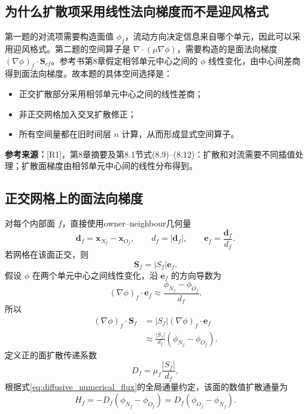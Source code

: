 \documentclass[UTF8,12pt,a4paper]{ctexart}
\numberwithin{equation}{section}
\newcommand{\Rone}{\textnormal{[R1]}}
\newcommand{\source}[1]{%
  \par\smallskip
  \noindent\colorbox{sourcebg}{%
    \parbox{0.955\linewidth}{\raggedright\footnotesize\color{sourcegray}\textbf{参考来源：}#1}%
  }
  \par\smallskip
}
\newcommand{\Sf}{\bm S}
\newcommand{\xf}{\bm x}
\newcommand{\ef}{\bm e}
\begin{document}
\subsection{为什么扩散项采用线性法向梯度而不是迎风格式}

第一题的对流项需要构造面值 $\phi_f$，流动方向决定信息来自哪个单元，因此可以采用迎风格式。第二题的空间算子是 $\nabla\cdot(\mu\nabla\phi)$，需要构造的是面法向梯度 $(\nabla\phi)_f\cdot\Sf_{cf}$。参考书第8章假定相邻单元中心之间的 $\phi$ 线性变化，由中心间差商得到面法向梯度。故本题的具体空间选择是：
\begin{itemize}
  \item 正交扩散部分采用相邻单元中心之间的线性差商；
  \item 非正交网格加入交叉扩散修正；
  \item 所有空间量都在旧时间层 $n$ 计算，从而形成显式空间算子。
\end{itemize}

\source{\Rone，第8章摘要及第8.1节式(8.9)--(8.12)：扩散和对流需要不同插值处理；扩散面梯度由相邻单元中心间的线性分布得到。}

\subsection{正交网格上的面法向梯度}

对每个内部面 $f$，直接使用owner--neighbour几何量
\begin{equation}
  \bm d_f=\xf_{N_f}-\xf_{O_f},
  \qquad
  d_f=|\bm d_f|,
  \qquad
  \ef_f=\frac{\bm d_f}{d_f}.
  \label{eq:center_vector}
\end{equation}
若网格在该面正交，则
\begin{equation}
  \Sf_f=|S_f|\ef_f.
  \label{eq:orthogonal_area_vector}
\end{equation}
假设 $\phi$ 在两个单元中心之间线性变化，沿 $\ef_f$ 的方向导数为
\begin{equation}
  (\nabla\phi)_f\cdot\ef_f
  \approx\frac{\phi_{N_f}-\phi_{O_f}}{d_f}.
  \label{eq:normal_difference}
\end{equation}
所以
\begin{align}
  (\nabla\phi)_f\cdot\Sf_f
  &=|S_f|(\nabla\phi)_f\cdot\ef_f
    \label{eq:orth_grad_1}\\
  &\approx\frac{|S_f|}{d_f}(\phi_{N_f}-\phi_{O_f}).
    \label{eq:orth_grad_2}
\end{align}
定义正的面扩散传递系数
\begin{equation}
  \boxed{D_f=\mu_f\frac{|S_f|}{d_f}},
  \label{eq:D_orth}
\end{equation}
根据式\eqref{eq:diffusive_numerical_flux}的全局通量约定，该面的数值扩散通量为
\begin{equation}
  \boxed{
  H_f=-D_f(\phi_{N_f}-\phi_{O_f})
  =D_f(\phi_{O_f}-\phi_{N_f})}.
  \label{eq:orth_face_contribution}
\end{equation}
\end{document}
